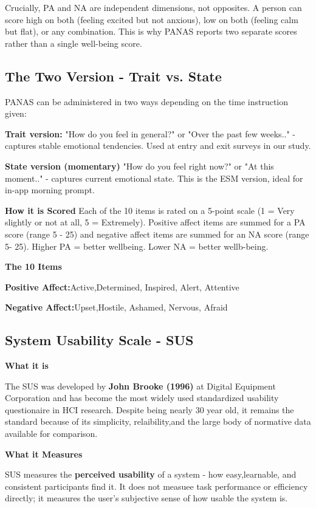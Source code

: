 \documentclass[12pt]{article}
\begin{document}
Crucially, PA and NA are independent dimensions, not opposites. A person can score high on both (feeling excited but not anxious), low on both (feeling calm but flat), or any combination. This is why PANAS reports two separate scores rather than a single well-being score.

\subsection{The Two Version - Trait vs. State}
PANAS can be administered in two ways depending on the time instruction given: 


\textbf{Trait version: } "How do you feel in general?" or "Over the past few weeks.." - captures stable emotional tendencies. Used at entry and exit surveys in our study.

\textbf{State version (momentary)} "How do you feel right now?" or "At this moment.." - captures current emotional state. This is the ESM version, ideal for in-app morning prompt.

\textbf{How it is Scored}
Each of the 10 items is rated on a 5-point scale (1 = Very slightly or not at all, 5 = Extremely). Positive affect items are summed for a PA score (range 5 - 25) and negative affect items are summed for an NA score (range 5- 25). Higher PA = better wellbeing. Lower NA = better wellb-being.

\textbf{The 10 Items}

\textbf{Positive Affect:}Active,Determined, Inspired, Alert, Attentive

\textbf{Negative Affect:}Upset,Hostile, Ashamed, Nervous, Afraid

\subsection{System Usability Scale - SUS}
\textbf{What it is}

The SUS was developed by \textbf{John Brooke (1996)} at Digital Equipment Corporation and has become the  most widely used standardized usability questionaire in HCI research. Despite being nearly 30 year old, it remains the standard because of its simplicity, relaibility,and the large body of normative data available for comparison. 

\textbf{What it Measures}

SUS measures the \textbf{perceived usability} of a system - how easy,learnable, and consistent participants find it. It does not measuee task performance or efficiency directly; it measures the user's subjective sense of how usable the system is.
\end{document}
